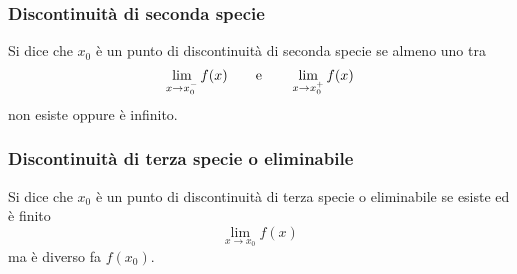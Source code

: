 \documentclass[11pt]{book}
\begin{document}
\subsubsection*{Discontinuità di seconda specie}
Si dice che $x_0$ è un punto di discontinuità di seconda specie se almeno uno tra
\begin{equation*}
    \lim_{x\rightarrow x_0^-}f(x)\qquad\textnormal{e}\qquad\lim_{x\rightarrow x_0^+}f(x)
\end{equation*}
non esiste oppure è infinito.
\subsubsection*{Discontinuità di terza specie o eliminabile}
Si dice che $x_0$ è un punto di discontinuità di terza specie o eliminabile se esiste ed è finito
\begin{equation*}
    \lim_{x\rightarrow x_0}f(x)
\end{equation*}
ma è diverso fa $f(x_0)$. 
\end{document}
